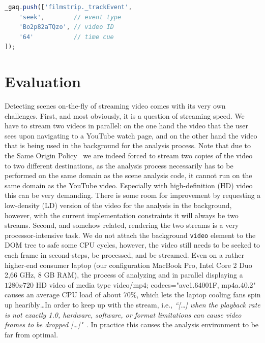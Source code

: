\documentclass[10pt,twocolumn,letterpaper]{article}
\begin{document}
\begin{lstlisting}[caption=JavaScript hot spot event tracking code snippet. The \texttt{\_gaq} object refers to the Google Analytics event tracking queue., label=code:event, float=t, language=JavaScript]
_gaq.push(['filmstrip._trackEvent', 
    'seek',        // event type
    'Bo2p82aTQzo', // video ID
    '64'           // time cue
]);
\end{lstlisting} 

\section{Evaluation} \label{sec:evaluation}
Detecting scenes on-the-fly of streaming video comes with its very own challenges. First, and most obviously, it is a question of streaming speed. We have to stream two videos in parallel: on the one hand the video that the user sees upon navigating to a YouTube watch page, and on the other hand the video that is being used in the background for the analysis process. Note that due to the Same Origin Policy~\cite{sameoriginpolicy} we are indeed forced to stream two copies of the video to two different destinations, as the analysis process necessarily has to be performed on the same domain as the scene analysis code, it cannot run on the same domain as the YouTube video. Especially with high-definition (HD) video this can be very demanding. There is some room for improvement by requesting a low-density (LD) version of the video for the analysis in the background, however, with the current implementation constraints it will always be two streams. Second, and somehow related, rendering the two streams is a very processor-intensive task. We do not attach the background \texttt{video} element to the DOM tree to safe some CPU cycles, however, the video still needs to be seeked to each frame in second-steps, be processed, and be streamed. Even on a rather higher-end consumer laptop (our configuration MacBook Pro, Intel Core 2 Duo 2,66 GHz, 8 GB RAM), the process of analyzing and in parallel displaying a $1280x720$ HD video of media type video/mp4; codecs="avc1.64001F, mp4a.40.2" causes an average CPU load of about 70\%, which lets the laptop cooling fans spin up hearibly\ldots In order to keep up with the stream, i.e., \textit{``[\ldots] when the playback rate is not exactly 1.0, hardware, software, or format limitations can cause video frames to be dropped [\ldots]"}~\cite{whatwgvideo}. In practice this causes the analysis environment to be far from optimal.
\end{document}
